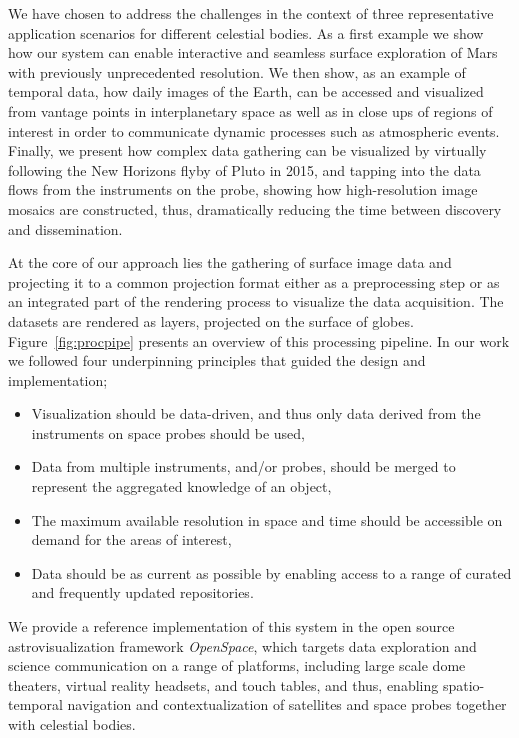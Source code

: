 \documentclass[journal]{vgtc}                %
\newcommand{\fig}[1]{Figure~\ref{fig:#1}}
\newcommand{\denselist}{\itemsep 0pt\parsep=1pt\partopsep 0pt}
\begin{document}
We have chosen to address the challenges in the context of three representative application scenarios for different celestial bodies.
As a first example we show how our system can enable interactive and seamless surface exploration of Mars with previously unprecedented resolution.
We then show, as an example of temporal data, how daily images of the Earth, can be accessed and visualized from vantage points in interplanetary space as well as in close ups of regions of interest in order to communicate dynamic processes such as atmospheric events.
Finally, we present how complex data gathering can be visualized by virtually following the New Horizons flyby of Pluto in 2015, and tapping into the data flows from the instruments on the probe, showing how high-resolution image mosaics are constructed, thus, dramatically reducing the time between discovery and dissemination.

At the core of our approach lies the gathering of surface image data and projecting it to a common projection format either as a preprocessing step or as an integrated part of the rendering process to visualize the data acquisition.
The datasets are rendered as layers, projected on the surface of globes.
\fig{procpipe} presents an overview of this processing pipeline.
In our work we followed four underpinning principles that guided the design and implementation;
\vspace*{-1.25mm}
\begin{itemize}\denselist
  \item Visualization should be data-driven, and thus only data derived from the instruments on space probes should be used,
  \item Data from multiple instruments, and/or probes, should be merged to represent the aggregated knowledge of an object,
  \item The maximum available resolution in space and time should be accessible on demand for the areas of interest,
  \item Data should be as current as possible by enabling access to a range of curated and frequently updated repositories.
\end{itemize}

\vspace*{-1.25mm}

We provide a reference implementation of this system in the open source astrovisualization framework \emph{OpenSpace}, which targets data exploration and science communication on a range of platforms, including large scale dome theaters, virtual reality headsets, and touch tables, and thus, enabling spatio-temporal navigation and contextualization of satellites and space probes together with celestial bodies.
\end{document}
